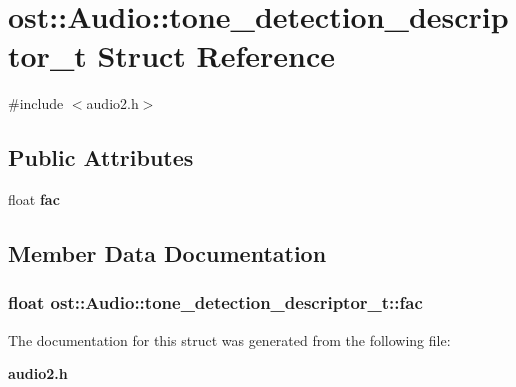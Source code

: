 \section{ost::Audio::tone\_\-detection\_\-descriptor\_\-t Struct Reference}
\label{structost_1_1_audio_1_1tone__detection__descriptor__t}


{\ttfamily \#include $<$audio2.h$>$}\subsection*{Public Attributes}
\begin{DoxyCompactItemize}
\item 
float {\bf fac}
\end{DoxyCompactItemize}


\subsection{Member Data Documentation}
\subsubsection[{fac}]{\setlength{\rightskip}{0pt plus 5cm}float {\bf ost::Audio::tone\_\-detection\_\-descriptor\_\-t::fac}}\label{structost_1_1_audio_1_1tone__detection__descriptor__t_a3624c9fe09774dc046df3f268325735e}


The documentation for this struct was generated from the following file:\begin{DoxyCompactItemize}
\item 
{\bf audio2.h}\end{DoxyCompactItemize}
